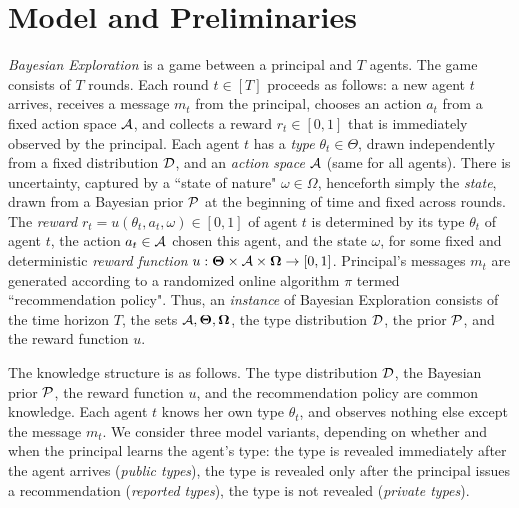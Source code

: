 \section{Model and Preliminaries}
\label{sec:model}


\emph{Bayesian Exploration} is a game between a principal and $T$ agents. The game consists of $T$ rounds. Each round $t\in [T]$ proceeds as follows: a new agent $t$ arrives, receives a message $m_t$ from the principal, chooses an action $a_t$ from a fixed action space $\mathcal{A}$, and collects a reward $r_t\in [0,1]$ that is immediately observed by the principal. Each agent $t$ has a {\em type} $\theta_t\in\varTheta$, drawn independently from a fixed distribution $\mathcal{D}$, and an {\em action space} $\mathcal{A}$ (same for all agents).  There is uncertainty, captured by a ``state of nature" $\omega\in \varOmega$, henceforth simply the \emph{state}, drawn from a Bayesian prior $\mathcal{P}$ at the beginning of time and fixed across rounds. The {\em reward} $r_t = u(\theta_t,a_t,\omega)\in[0,1]$ of agent $t$ is determined by its type $\theta_t$ of agent $t$, the action $a_t\in\mathcal{A}$ chosen this agent, and the state $\omega$, for some fixed and deterministic \emph{reward function}
$u:\bold{\Theta}\times \mathcal{A} \times \bold{\Omega} \to [0,1]$.  
Principal's messages $m_t$ are generated according to a randomized online algorithm $\pi$ termed ``recommendation policy". 
Thus, an {\em instance}
of Bayesian Exploration consists of the time horizon $T$, the sets $\mathcal{A},\bold{\Theta},\bold{\Omega}$,
the type distribution $\mathcal{D}$, the prior $\mathcal{P}$, and the reward function $u$.


The knowledge structure is as follows. The type distribution $\mathcal{D}$, the Bayesian prior $\mathcal{P}$, the reward function $u$, and the recommendation policy are common knowledge. Each agent $t$ knows her own type $\theta_t$, and observes nothing else except the message $m_t$.  We consider three model variants, depending on whether and when the principal learns the agent's type: the type is revealed immediately after the agent arrives (\emph{public types}), the type is revealed only after the principal issues a recommendation (\emph{reported types}), the type is not revealed (\emph{private types}).


